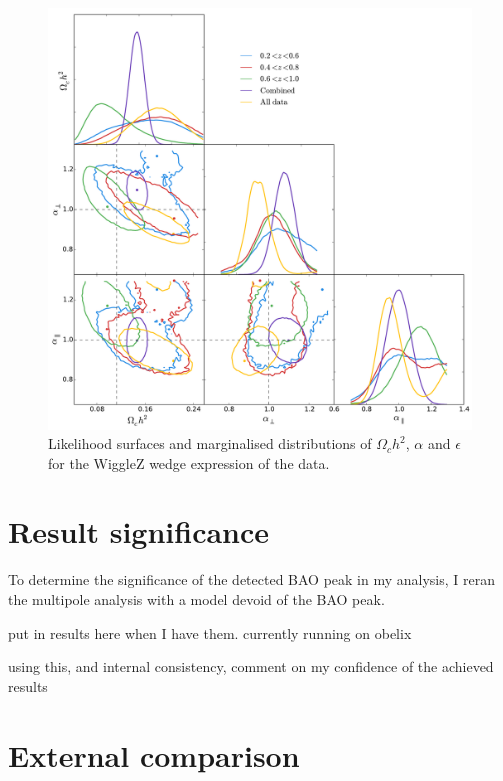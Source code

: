 \documentclass[titlesmallcaps, examinerscopy, copyrightpage]{uqthesis}
\newcommand{\red}{\color{red}}
\begin{document}
\begin{figure}[h!]
  \begin{center}
    \includegraphics[width=\textwidth]{images/corCombinedWedgeWig.pdf}
  \end{center}
  \caption{Likelihood surfaces and marginalised distributions of $\Omega_ch^2$, $\alpha$ and $\epsilon$ for the WiggleZ wedge expression of the data. }
  \label{fig:wigglezBinsWdg}
\end{figure}


\clearpage
\section{Result significance}

To determine the significance of the detected BAO peak in my analysis, I reran the multipole analysis with a model devoid of the BAO peak. 

{\red put in results here when I have them. currently running on obelix}

{\red using this, and internal consistency, comment on my confidence of the achieved results}

\clearpage
\section{External comparison}
\end{document}
